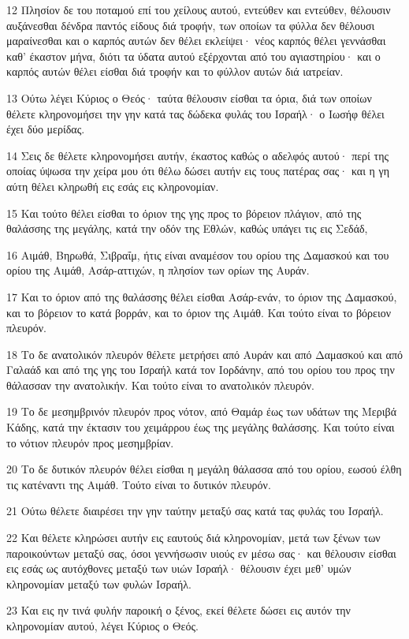 \par 12 Πλησίον δε του ποταμού επί του χείλους αυτού, εντεύθεν και εντεύθεν, θέλουσιν αυξάνεσθαι δένδρα παντός είδους διά τροφήν, των οποίων τα φύλλα δεν θέλουσι μαραίνεσθαι και ο καρπός αυτών δεν θέλει εκλείψει· νέος καρπός θέλει γεννάσθαι καθ' έκαστον μήνα, διότι τα ύδατα αυτού εξέρχονται από του αγιαστηρίου· και ο καρπός αυτών θέλει είσθαι διά τροφήν και το φύλλον αυτών διά ιατρείαν.
\par 13 Ούτω λέγει Κύριος ο Θεός· ταύτα θέλουσιν είσθαι τα όρια, διά των οποίων θέλετε κληρονομήσει την γην κατά τας δώδεκα φυλάς του Ισραήλ· ο Ιωσήφ θέλει έχει δύο μερίδας.
\par 14 Σεις δε θέλετε κληρονομήσει αυτήν, έκαστος καθώς ο αδελφός αυτού· περί της οποίας ύψωσα την χείρα μου ότι θέλω δώσει αυτήν εις τους πατέρας σας· και η γη αύτη θέλει κληρωθή εις εσάς εις κληρονομίαν.
\par 15 Και τούτο θέλει είσθαι το όριον της γης προς το βόρειον πλάγιον, από της θαλάσσης της μεγάλης, κατά την οδόν της Εθλών, καθώς υπάγει τις εις Σεδάδ,
\par 16 Αιμάθ, Βηρωθά, Σιβραΐμ, ήτις είναι αναμέσον του ορίου της Δαμασκού και του ορίου της Αιμάθ, Ασάρ-αττιχών, η πλησίον των ορίων της Αυράν.
\par 17 Και το όριον από της θαλάσσης θέλει είσθαι Ασάρ-ενάν, το όριον της Δαμασκού, και το βόρειον το κατά βορράν, και το όριον της Αιμάθ. Και τούτο είναι το βόρειον πλευρόν.
\par 18 Το δε ανατολικόν πλευρόν θέλετε μετρήσει από Αυράν και από Δαμασκού και από Γαλαάδ και από της γης του Ισραήλ κατά τον Ιορδάνην, από του ορίου του προς την θάλασσαν την ανατολικήν. Και τούτο είναι το ανατολικόν πλευρόν.
\par 19 Το δε μεσημβρινόν πλευρόν προς νότον, από Θαμάρ έως των υδάτων της Μεριβά Κάδης, κατά την έκτασιν του χειμάρρου έως της μεγάλης θαλάσσης. Και τούτο είναι το νότιον πλευρόν προς μεσημβρίαν.
\par 20 Το δε δυτικόν πλευρόν θέλει είσθαι η μεγάλη θάλασσα από του ορίου, εωσού έλθη τις κατέναντι της Αιμάθ. Τούτο είναι το δυτικόν πλευρόν.
\par 21 Ούτω θέλετε διαιρέσει την γην ταύτην μεταξύ σας κατά τας φυλάς του Ισραήλ.
\par 22 Και θέλετε κληρώσει αυτήν εις εαυτούς διά κληρονομίαν, μετά των ξένων των παροικούντων μεταξύ σας, όσοι γεννήσωσιν υιούς εν μέσω σας· και θέλουσιν είσθαι εις εσάς ως αυτόχθονες μεταξύ των υιών Ισραήλ· θέλουσιν έχει μεθ' υμών κληρονομίαν μεταξύ των φυλών Ισραήλ.
\par 23 Και εις ην τινά φυλήν παροική ο ξένος, εκεί θέλετε δώσει εις αυτόν την κληρονομίαν αυτού, λέγει Κύριος ο Θεός.

